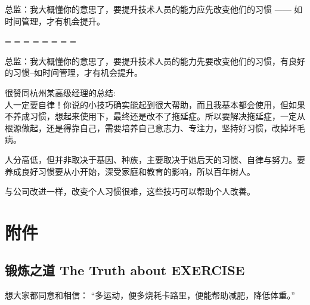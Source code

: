 总监：我大概懂你的意思了，要提升技术人员的能力应先改变他们的习惯 —— 如时间管理，才有机会提升。\\

\begin{description}
\tightlist
\item[]
= = = = = = = =
\end{description}

总监：我大概懂你的意思了，要提升技术人员的能力先要改变他们的习惯，有良好的习惯--如时间管理，才有机会提升。\\




很赞同杭州某高级经理的总结:\\
人一定要自律！你说的小技巧确实能起到很大帮助，而且我基本都会使用，但如果不养成习惯，想起来使用下，最终还是改不了拖延症。所以要解决拖延症，一定从根源做起，还是得靠自己，需要培养自己意志力、专注力，坚持好习惯，改掉坏毛病。


人分高低，但并非取决于基因、种族，主要取决于她后天的习惯、自律与努力。要养成良好习惯要从小开始，深受家庭和教育的影响，所以百年树人。

与公司改进一样，改变个人习惯很难，这些技巧可以帮助个人改善。

\hypertarget{ux9644ux4ef6}{%
\section{附件}\label{ux9644ux4ef6}}


\hypertarget{ux953bux70bcux4e4bux9053-the-truth-about-exercise}{%
\subsection{锻炼之道 The Truth about
EXERCISE}\label{ux953bux70bcux4e4bux9053-the-truth-about-exercise}}

想大家都同意和相信：
``多运动，便多烧耗卡路里，便能帮助减肥，降低体重。''

